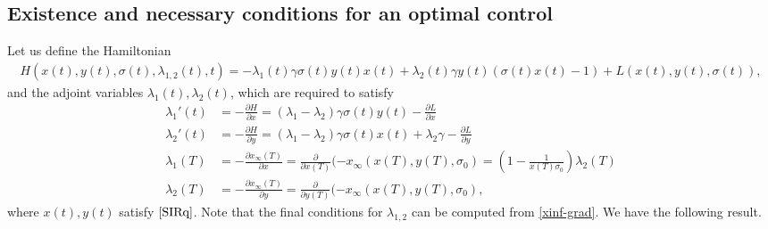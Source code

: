\documentclass[english,12pt,letter]{article}
\newcommand{\Rnot}{\sigma_0}
\newcommand{\Sinf}{x_\infty}
\newcommand{\dom}{{\mathcal D}}
\begin{document}
\subsection{Existence and necessary conditions for an optimal control\label{sec:pmp}}
Let us define the Hamiltonian
\begin{align} \label{eq:ham}
    H(x(t),y(t), \sigma(t), \lambda_{1,2}(t), t) = -\lambda_1(t) \gamma \sigma(t) y(t) x(t) + \lambda_2(t)\gamma y(t)(\sigma(t) x(t) - 1) + L(x(t),y(t),\sigma(t)),
\end{align}
and the adjoint variables $\lambda_1(t), \lambda_2(t)$, which are required to satisfy
\begin{subequations}\label{lambda-odes}
\begin{align} 
    \lambda_1'(t) & = -\frac{\partial H}{\partial x} = (\lambda_1-\lambda_2)\gamma\sigma(t) y(t) - \frac{\partial L}{\partial x} \\
    \lambda_2'(t) & = -\frac{\partial H}{\partial y} = (\lambda_1-\lambda_2)\gamma\sigma(t) x(t) + \lambda_2 \gamma - \frac{\partial L}{\partial y} \\
    \lambda_1(T) & = -\frac{\partial \Sinf(T)}{\partial x} =\frac{\partial }{\partial x(T)} (-x_\infty(x(T),y(T),\Rnot) = \left(1-\frac{1}{x(T)\Rnot}\right)\lambda_2(T) \label{bc1} \\
    \lambda_2(T) & = -\frac{\partial \Sinf(T)}{\partial y} = \frac{\partial }{\partial y(T)} (-x_\infty(x(T),y(T),\Rnot), \label{bc2}
\end{align}
\end{subequations}
where $x(t), y(t)$ satisfy $\eqref{SIRq}$.
Note that the final conditions for $\lambda_{1,2}$ can be computed from \eqref{xinf-grad}.
We have the following result.
\end{document}
